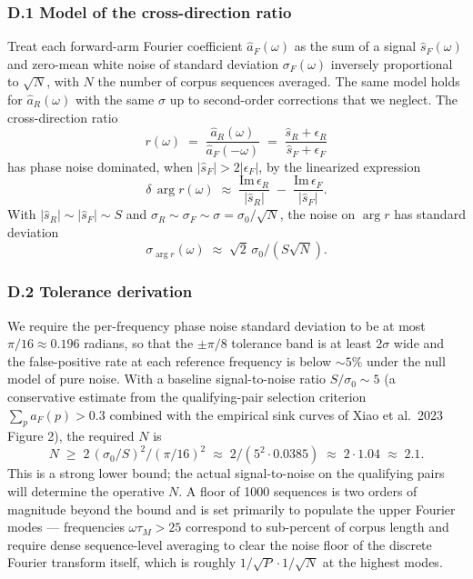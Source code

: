 \documentclass[
  letterpaper,
  11pt]{article}
\theoremstyle{plain}
\theoremstyle{definition}
\theoremstyle{remark}
\begin{document}
\subsubsection{D.1 Model of the cross-direction ratio}\label{d.1-model-of-the-cross-direction-ratio}

Treat each forward-arm Fourier coefficient \(\hat a_F(\omega)\) as the sum of a signal \(\hat s_F(\omega)\) and zero-mean white noise of standard deviation \(\sigma_F(\omega)\) inversely proportional to \(\sqrt{N}\), with \(N\) the number of corpus sequences averaged. The same model holds for \(\hat a_R(\omega)\) with the same \(\sigma\) up to second-order corrections that we neglect. The cross-direction ratio
\[r(\omega) \;=\; \frac{\hat a_R(\omega)}{\hat a_F(-\omega)} \;=\; \frac{\hat s_R + \epsilon_R}{\hat s_F + \epsilon_F}\]
has phase noise dominated, when \(|\hat s_F| > 2|\epsilon_F|\), by the linearized expression
\[\delta\,\arg r(\omega) \;\approx\; \frac{\mathrm{Im}\,\epsilon_R}{|\hat s_R|} \;-\; \frac{\mathrm{Im}\,\epsilon_F}{|\hat s_F|}.\]
With \(|\hat s_R| \sim |\hat s_F| \sim S\) and \(\sigma_R \sim \sigma_F \sim \sigma = \sigma_0/\sqrt{N}\), the noise on \(\arg r\) has standard deviation
\[\sigma_{\arg r}(\omega) \;\approx\; \sqrt{2}\,\sigma_0 / (S \sqrt{N}).\]

\subsubsection{D.2 Tolerance derivation}\label{d.2-tolerance-derivation}

We require the per-frequency phase noise standard deviation to be at most \(\pi/16 \approx 0.196\) radians, so that the \(\pm\pi/8\) tolerance band is at least 2\(\sigma\) wide and the false-positive rate at each reference frequency is below \(\sim 5\%\) under the null model of pure noise. With a baseline signal-to-noise ratio \(S/\sigma_0 \sim 5\) (a conservative estimate from the qualifying-pair selection criterion \(\sum_p a_F(p) > 0.3\) combined with the empirical sink curves of Xiao et al.~2023 Figure 2), the required \(N\) is
\[N \;\geq\; 2\,(\sigma_0/S)^2 / (\pi/16)^2 \;\approx\; 2 / (5^2 \cdot 0.0385) \;\approx\; 2 \cdot 1.04 \;\approx\; 2.1.\]
This is a strong lower bound; the actual signal-to-noise on the qualifying pairs will determine the operative \(N\). A floor of 1000 sequences is two orders of magnitude beyond the bound and is set primarily to populate the upper Fourier modes --- frequencies \(\omega \tau_M > 25\) correspond to sub-percent of corpus length and require dense sequence-level averaging to clear the noise floor of the discrete Fourier transform itself, which is roughly \(1/\sqrt{P} \cdot 1/\sqrt{N}\) at the highest modes.
\end{document}
